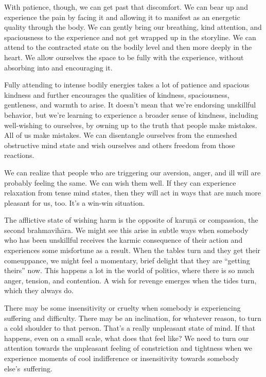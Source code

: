 With patience, though, we can get past that discomfort. We can bear up and experience the pain by facing it and allowing it to manifest as an energetic quality through the body. We can gently bring our breathing, kind attention, and spaciousness to the experience and not get wrapped up in the storyline. We can attend to the contracted state on the bodily level and then more deeply in the heart. We allow ourselves the space to be fully with the experience, without absorbing into and encouraging it.

Fully attending to intense bodily energies takes a lot of patience and spacious kindness and further encourages the qualities of kindness, spaciousness, gentleness, and warmth to arise. It doesn't mean that we're endorsing unskillful behavior, but we're learning to experience a broader sense of kindness, including well-wishing to ourselves, by owning up to the truth that people make mistakes. All of us make mistakes. We can disentangle ourselves from the enmeshed obstructive mind state and wish ourselves and others freedom from those reactions.

We can realize that people who are triggering our aversion, anger, and ill will are probably feeling the same. We can wish them well. If they can experience relaxation from tense mind states, then they will act in ways that are much more pleasant for us, too. It's a win-win situation.

The afflictive state of wishing harm is the opposite of karuṇā or compassion, the second brahmavihāra. We might see this arise in subtle ways when somebody who has been unskillful receives the karmic consequence of their action and experiences some misfortune as a result. When the tables turn and they get their comeuppance, we might feel a momentary, brief delight that they are ``getting theirs'' now. This happens a lot in the world of politics, where there is so much anger, tension, and contention. A wish for revenge emerges when the tides turn, which they always do.

There may be some insensitivity or cruelty when somebody is experiencing suffering and difficulty. There may be an inclination, for whatever reason, to turn a cold shoulder to that person. That's a really unpleasant state of mind. If that happens, even on a small scale, what does that feel like? We need to turn our attention towards the unpleasant feeling of constriction and tightness when we experience moments of cool indifference or insensitivity towards somebody \mbox{else's suffering.}


